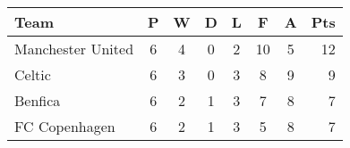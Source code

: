 \documentclass{article}
\begin{document}
             \begin{tabular}{l*{6}{c}r}
                     Team              & P & W & D & L & F  & A & Pts \\
                    \hline
                     Manchester United & 6 & 4 & 0 & 2 & 10 & 5 & 12  \\
                     Celtic            & 6 & 3 & 0 & 3 &  8 & 9 &  9  \\
                     Benfica           & 6 & 2 & 1 & 3 &  7 & 8 &  7  \\
                     FC Copenhagen     & 6 & 2 & 1 & 3 &  5 & 8 &  7  \\
             \end{tabular}
   
\end{document}
